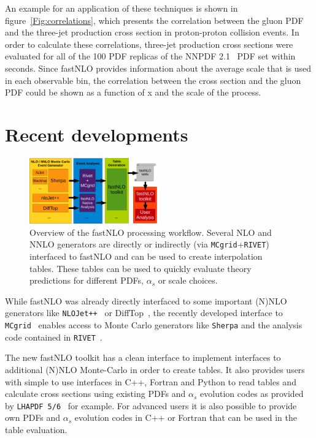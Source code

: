 \documentclass{PoS}
\begin{document}
An example for an application of these techniques is shown in figure~\ref{Fig:correlations},
which presents the correlation between the gluon PDF and the three-jet production
cross section in proton-proton collision events.
In order to calculate these correlations, three-jet production cross sections
were evaluated for all of the 100 PDF replicas of the NNPDF 2.1~\cite{Ball:2011uy}
PDF set within seconds. Since fastNLO provides information about the average
scale that is used in each observable bin, the correlation
between the cross section and the gluon PDF could be shown as a function
of x and the scale of the process.

\newpage
\section{Recent developments}

\begin{figure}
  \centering
  \includegraphics[width=0.49\textwidth]{interface-crop}
  \caption{Overview of the fastNLO processing workflow. Several
    NLO and NNLO generators are directly or indirectly (via \texttt{MCgrid}+\texttt{RIVET})
    interfaced to fastNLO and can be used to create interpolation tables.
    These tables can be used to quickly evaluate theory predictions
    for different PDFs, $\alpha_s$ or scale choices.}
  \label{Fig:interface}
\end{figure}

While fastNLO was already directly interfaced to some important (N)NLO generators
like \texttt{NLOJet++}~\cite{Nagy:1998bb,Nagy:2001xb,Nagy:2003tz} or DiffTop~\cite{Guzzi:2014wia},
the recently developed interface to \texttt{MCgrid}~\cite{DelDebbio:2013kxa}
enables access to Monte Carlo generators like \texttt{Sherpa}\cite{Gleisberg:2008ta}
and the analysis code contained in \texttt{RIVET}~\cite{Buckley:2010ar}.

The new fastNLO toolkit has a clean interface to implement interfaces
to additional (N)NLO Monte-Carlo in order to create tables.
It also provides users with simple to use interfaces in C++, Fortran
and Python to read tables and calculate cross sections using existing
PDFs and $\alpha_s$ evolution codes as provided by
\texttt{LHAPDF 5/6}~\cite{Buckley:2014ana,Bourilkov:2006cj} for example.
For advanced users it is also possible to provide own PDFs and
$\alpha_s$ evolution codes in C++ or Fortran that can be used in the table evaluation.
\end{document}
